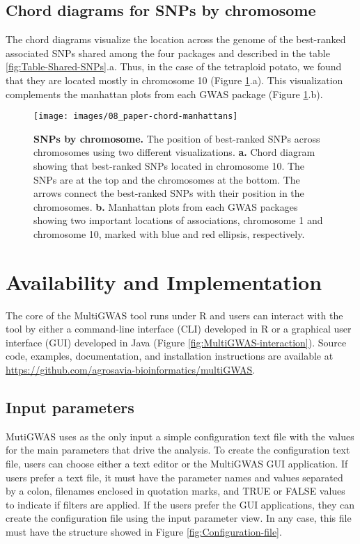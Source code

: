 \documentclass{article}
\begin{document}
\subsection{Chord diagrams for SNPs by chromosome}
The chord diagrams visualize the location across the genome of the best-ranked associated SNPs shared among the four packages and described in the table \ref{fig:Table-Shared-SNPs}.a.  Thus, in the case of the tetraploid potato, we found that they are located mostly in chromosome 10  (Figure \ref{fig:Chord-diagrams}.a). This visualization complements the manhattan plots from each GWAS package (Figure \ref{fig:Chord-diagrams}.b).


\begin{figure}
\begin{centering}
\texttt{[image: images/08\_paper-chord-manhattans]}
\par\end{centering}
\caption{\textbf{SNPs by chromosome.} The position of best-ranked SNPs across chromosomes using two different visualizations. \textbf{a.} Chord diagram showing that best-ranked SNPs located in chromosome 10. The SNPs are at the top and the chromosomes at the bottom. The arrows connect the best-ranked SNPs with their position in the chromosomes. \textbf{b.} Manhattan plots from each GWAS packages showing two important locations of associations, chromosome 1 and chromosome 10, marked with blue and red ellipsis, respectively. \label{fig:Chord-diagrams}}
\end{figure}

\section{Availability and Implementation}

The core of the MultiGWAS tool runs under R and users can interact with the tool by either a command-line interface (CLI) developed in
R or a graphical user interface (GUI) developed in Java (Figure \ref{fig:MultiGWAS-interaction}).
Source code, examples, documentation, and installation instructions are available at \url{https://github.com/agrosavia-bioinformatics/multiGWAS}. 

\subsection{Input parameters}

MutiGWAS uses as the only input a simple configuration text file with the values for the main parameters that drive the analysis. To create the configuration text file, users can choose either a text editor or the MultiGWAS GUI application.  If users prefer a text file, it must have the parameter names and values separated by a colon, filenames enclosed in quotation marks, and TRUE or FALSE values to indicate if filters are applied. If the users prefer the GUI applications, they can create the configuration file using the input parameter view. In any case, this file must have the structure showed in Figure \ref{fig:Configuration-file}.
\end{document}
